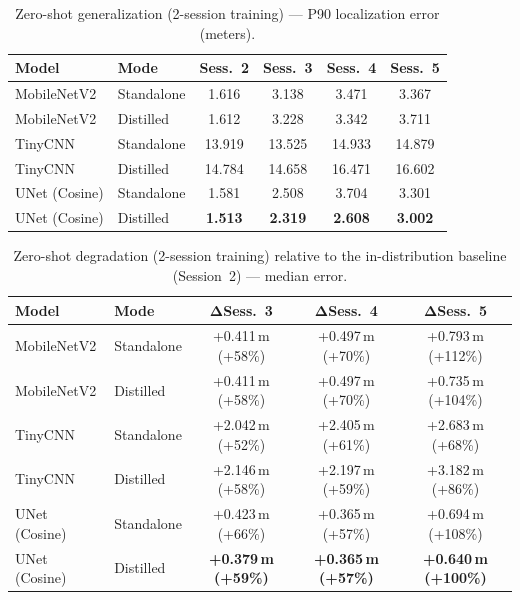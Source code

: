 \documentclass[11pt,a4paper]{article}
\newcommand{\best}[1]{\textcolor{bestcolor}{\textbf{#1}}}
\begin{document}
\begin{table}[H]
\centering
\caption{Zero-shot generalization (2-session training) --- P90 localization error (meters).}
\label{tab:cross_session_p90}
\begin{tabular}{@{}llcccc@{}}
\toprule
\textbf{Model} & \textbf{Mode} & \textbf{Sess.~2} & \textbf{Sess.~3} & \textbf{Sess.~4} & \textbf{Sess.~5} \\
\midrule
MobileNetV2   & Standalone & 1.616 & 3.138 & 3.471 & 3.367 \\
MobileNetV2   & Distilled  & 1.612 & 3.228 & 3.342 & 3.711 \\
\midrule
TinyCNN       & Standalone & 13.919& 13.525& 14.933& 14.879 \\
TinyCNN       & Distilled  & 14.784& 14.658& 16.471& 16.602 \\
\midrule
UNet (Cosine) & Standalone & 1.581 & 2.508 & 3.704 & 3.301 \\
UNet (Cosine) & Distilled  & \best{1.513} & \best{2.319} & \best{2.608} & \best{3.002} \\
\bottomrule
\end{tabular}
\end{table}

\begin{table}[H]
\centering
\caption{Zero-shot degradation (2-session training) relative to the in-distribution baseline (Session~2) --- median error.}
\label{tab:cross_session_delta}
\begin{tabular}{@{}llccc@{}}
\toprule
\textbf{Model} & \textbf{Mode} & $\boldsymbol{\Delta}$\textbf{Sess.~3} & $\boldsymbol{\Delta}$\textbf{Sess.~4} & $\boldsymbol{\Delta}$\textbf{Sess.~5} \\
\midrule
MobileNetV2   & Standalone & +0.411\,m (+58\%) & +0.497\,m (+70\%) & +0.793\,m (+112\%) \\
MobileNetV2   & Distilled  & +0.411\,m (+58\%) & +0.497\,m (+70\%) & +0.735\,m (+104\%) \\
\midrule
TinyCNN       & Standalone & +2.042\,m (+52\%) & +2.405\,m (+61\%) & +2.683\,m (+68\%) \\
TinyCNN       & Distilled  & +2.146\,m (+58\%) & +2.197\,m (+59\%) & +3.182\,m (+86\%) \\
\midrule
UNet (Cosine) & Standalone & +0.423\,m (+66\%) & +0.365\,m (+57\%) & +0.694\,m (+108\%) \\
UNet (Cosine) & Distilled  & \best{+0.379\,m (+59\%)} & \best{+0.365\,m (+57\%)} & \best{+0.640\,m (+100\%)} \\
\bottomrule
\end{tabular}
\end{table}
\end{document}
